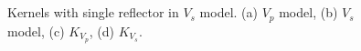 \documentclass[extra,mreferee]{gji}
\begin{document}
\begin{figure}
   \centering
   \\
   \\
   \caption{Kernels with single reflector in $V_s$ model. (a) $V_p$ model, (b) $V_s$ model, (c) $K_{V_p}$, (d) $K_{V_s}$.}
   \label{fig:kernel2}
\end{figure}
\end{document}
